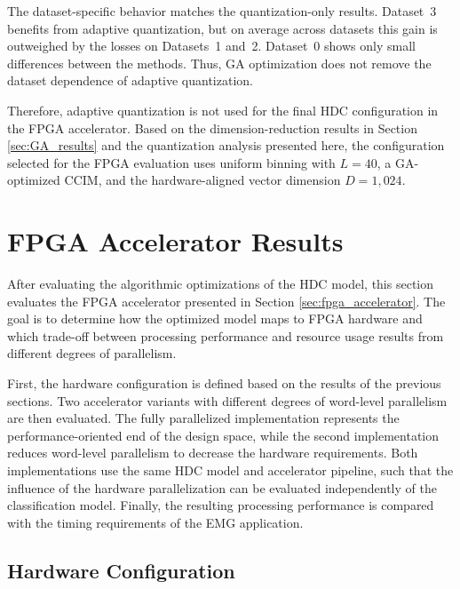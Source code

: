 The dataset-specific behavior matches the quantization-only results. Dataset~3 benefits from adaptive quantization, but on average across datasets this gain is outweighed by the losses on Datasets~1 and~2. Dataset~0 shows only small differences between the methods. Thus, GA optimization does not remove the dataset dependence of adaptive quantization.

Therefore, adaptive quantization is not used for the final HDC configuration in the FPGA accelerator. Based on the dimension-reduction results in Section \ref{sec:GA_results} and the quantization analysis presented here, the configuration selected for the FPGA evaluation uses uniform binning with $L=40$, a GA-optimized CCIM, and the hardware-aligned vector dimension $D=1{,}024$.


\section{FPGA Accelerator Results}
\label{sec:FPGA_results}

After evaluating the algorithmic optimizations of the HDC model, this section evaluates the FPGA accelerator presented in Section \ref{sec:fpga_accelerator}. The goal is to determine how the optimized model maps to FPGA hardware and which trade-off between processing performance and resource usage results from different degrees of parallelism.

First, the hardware configuration is defined based on the results of the previous sections. Two accelerator variants with different degrees of word-level parallelism are then evaluated. The fully parallelized implementation represents the performance-oriented end of the design space, while the second implementation reduces word-level parallelism to decrease the hardware requirements. Both implementations use the same HDC model and accelerator pipeline, such that the influence of the hardware parallelization can be evaluated independently of the classification model. Finally, the resulting processing performance is compared with the timing requirements of the EMG application.

\subsection{Hardware Configuration}
\label{sec:hardware_config_FPGA}

